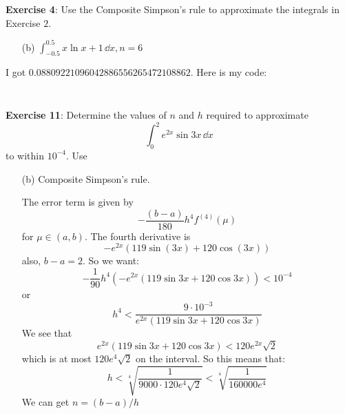 \documentclass{article}
\begin{document}
\textbf{Exercise 4}: Use the Composite Simpson's rule to approximate the integrals in Exercise $2$.
    \begin{itemize}
        \item [(b)] $\int_{-0.5}^{0.5} x \ln{x + 1} \, \dd{x}, n = 6$
    \end{itemize}
    \begin{answer}
        I got $0.08809221096042886556265472108862$. Here is my code:
        \inputminted{matlab}{./code/CompositeIntegration/CompositeSimpson.m}
        \inputminted{matlab}{./code/script4.m}
    \end{answer}

\textbf{Exercise 11}: Determine the values of $n$ and $h$ required to approximate 
    \begin{equation*}
        \int_{0}^{2} e^{2x} \sin{3x} \, \dd{x}
    \end{equation*}
to within $10^{-4}$. Use 
    \begin{itemize}
        \item [(b)] Composite Simpson's rule.
            \begin{answer}
                The error term is given by
                    \begin{equation*}
                        -\dfrac{(b - a)}{180}h^{4}f^{(4)}(\mu)
                    \end{equation*}
                for $\mu \in (a, b)$. The fourth derivative is
                    \begin{equation*}
                        -e^{2x} (119 \sin(3 x) + 120 \cos(3 x))
                    \end{equation*}
                also, $b - a = 2$. So we want:
                    \begin{equation*}
                        -\dfrac{1}{90}h^{4} (-e^{2x}(119 \sin{3x} + 120 \cos{3x})) < 10^{-4}
                    \end{equation*}
                or 
                    \begin{equation*}
                        h^{4} < \dfrac{9 \cdot 10^{-3}}{e^{2x}(119 \sin{3x} + 120 \cos{3x})}
                    \end{equation*}
                We see that 
                    \begin{equation*}
                        e^{2x}(119\sin{3x} + 120 \cos{3x}) < 120e^{2x}\sqrt{2}
                    \end{equation*}
                which is at most $120e^{4}\sqrt{2}$ on the interval. So this means that:
                    \begin{equation*}
                        h < \sqrt[4]{\dfrac{1}{9000 \cdot 120e^{4}\sqrt{2}}} < \sqrt[4]{\dfrac{1}{160000e^{4}}}
                    \end{equation*}
                We can get $n = (b - a) / h$
            \end{answer}
    \end{itemize}
\end{document}
